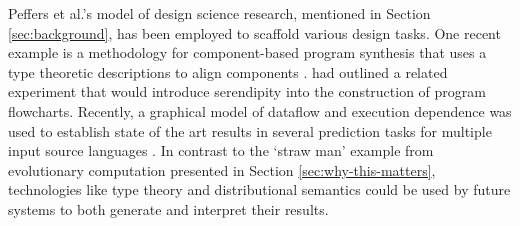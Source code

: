 Peffers et al.'s model of design science research, mentioned in
Section \ref{sec:background}, has been employed to scaffold various
design tasks.  One recent example is a methodology for component-based
program synthesis that uses a type theoretic descriptions to align
components \cite{10.1007/978-3-030-03427-6_35}.
\citet{pease2013discussion} had outlined a related experiment that
would introduce serendipity into the construction of program
flowcharts.  Recently, a graphical model of dataflow and execution
dependence was used to establish state of the art results in several
prediction tasks for multiple input source languages
\cite{NIPS2018_7617}.  In contrast to the `straw man' example from
evolutionary computation presented in Section
\ref{sec:why-this-matters}, technologies like type theory and
distributional semantics \cite{DBLP:journals/corr/abs-1803-09473}
could be used by future systems to both generate and interpret their
results.


